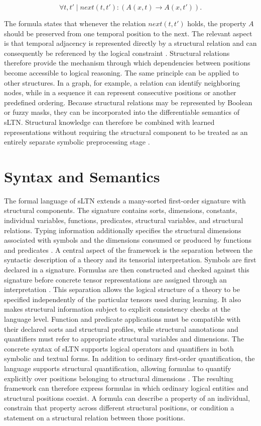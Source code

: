 $$
\forall t,t' \mid \mathit{next}(t,t') :
\left(A(x,t) \rightarrow A(x,t')\right).
$$

The formula states that whenever the relation $\mathit{next}(t,t')$ holds, the property $A$ should be preserved from one temporal position to the next. The relevant aspect is that temporal adjacency is represented directly by a structural relation and can consequently be referenced by the logical constraint \cite{rinaldi2026sltn}.
Structural relations therefore provide the mechanism through which dependencies between positions become accessible to logical reasoning. The same principle can be applied to other structures. In a graph, for example, a relation can identify neighboring nodes, while in a sequence it can represent consecutive positions or another predefined ordering.
Because structural relations may be represented by Boolean or fuzzy masks, they can be incorporated into the differentiable semantics of sLTN. Structural knowledge can therefore be combined with learned representations without requiring the structural component to be treated as an entirely separate symbolic preprocessing stage \cite{rinaldi2026sltn}.

\section{Syntax and Semantics}
\noindent
The formal language of sLTN extends a many-sorted first-order signature with structural components. The signature contains sorts, dimensions, constants, individual variables, functions, predicates, structural variables, and structural relations. Typing information additionally specifies the structural dimensions associated with symbols and the dimensions consumed or produced by functions and predicates \cite{rinaldi2026sltn}.
A central aspect of the framework is the separation between the syntactic description of a theory and its tensorial interpretation. Symbols are first declared in a signature. Formulas are then constructed and checked against this signature before concrete tensor representations are assigned through an interpretation \cite{rinaldi2026sltn}.
This separation allows the logical structure of a theory to be specified independently of the particular tensors used during learning. It also makes structural information subject to explicit consistency checks at the language level. Function and predicate applications must be compatible with their declared sorts and structural profiles, while structural annotations and quantifiers must refer to appropriate structural variables and dimensions.
The concrete syntax of sLTN supports logical operators and quantifiers in both symbolic and textual forms. In addition to ordinary first-order quantification, the language supports structural quantification, allowing formulas to quantify explicitly over positions belonging to structural dimensions \cite{rinaldi2026sltn}.
The resulting framework can therefore express formulas in which ordinary logical entities and structural positions coexist. A formula can describe a property of an individual, constrain that property across different structural positions, or condition a statement on a structural relation between those positions.


